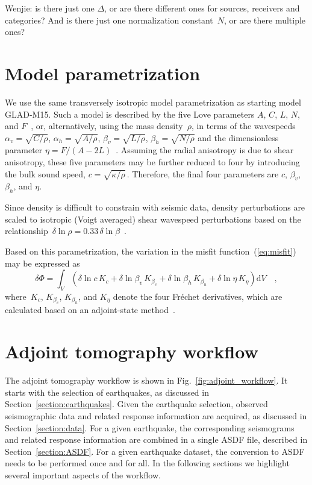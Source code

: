 \documentclass[extra,mreferee]{gji}
\begin{document}
{\color{red} Wenjie: is there just one $\Delta$, or are there different ones for sources, receivers and categories? And is there just one normalization constant~$N$, or are there multiple ones?}

\section{Model parametrization}

We use the same transversely isotropic model parametrization as starting model GLAD-M15.
Such a model is described by the five Love parameters $A$, $C$, $L$, $N$, and $F$~\citep{Love27},
or, alternatively, using the mass density~$\rho$, in terms of the wavespeeds~$\alpha_v=\sqrt{C/\rho}$, $\alpha_h=\sqrt{A/\rho}$, $\beta_v=\sqrt{L/\rho}$, $\beta_h=\sqrt{N/\rho}$ and the dimensionless parameter $\eta=F/(A-2L)$~\citep{PREM,DT98}.
Assuming the radial anisotropy is due to shear anisotropy, these five parameters
may be further reduced to four by introducing the bulk sound speed,
$c=\sqrt{\kappa/\rho}$\,.
Therefore, the final four parameters are $c$, $\beta_v$, $\beta_h$, and $\eta$.

Since density is difficult to constrain with seismic data,
density perturbations are scaled to isotropic (Voigt averaged) shear wavespeed perturbations based on the relationship~$\delta\ln\rho = 0.33\,\delta\ln\beta$~\citep{montagner1989petrological}.

Based on this parametrization,
the variation in the misfit function~(\ref{eq:misfit}) may be expressed as~\citep{zhu2015seismic,bozdaug2016global}
\begin{equation}
    \delta \Phi = \int_V
      (\delta \ln c\,K_c + \delta \ln\beta_v\,K_{\beta_v} + \delta \ln\beta_h\,K_{\beta_h} +
      \delta\ln\eta\,K_\eta) \mathrm{d}V
      \quad ,
\end{equation}
where~$K_c$, $K_{\beta_v}$, $K_{\beta_h}$, and $K_\eta$ denote the four Fr\'echet derivatives,
which are calculated based on an adjoint-state method~\citep[e.g.,][]{Plessix_2006_RAS,Tromp2005}.

\section{Adjoint tomography workflow}

The adjoint tomography workflow is shown in Fig.~\ref{fig:adjoint_workflow}.
It starts with the selection of earthquakes, as discussed in Section~\ref{section:earthquakes}.
Given the earthquake selection,
observed seismographic data and related response information are acquired,
as discussed in Section~\ref{section:data}.
For a given earthquake,
the corresponding seismograms and related response information are combined in a single ASDF file,
described in Section~\ref{section:ASDF}.
For a given earthquake dataset, the conversion to ASDF needs to be performed once and for all.
In the following sections we highlight several important aspects of the workflow.
\end{document}
